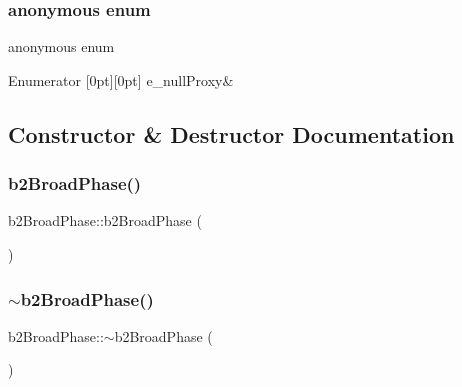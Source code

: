 \subsubsection{\texorpdfstring{anonymous enum}{anonymous enum}}
{\footnotesize\ttfamily anonymous enum}

\begin{DoxyEnumFields}{Enumerator}
[0pt][0pt]{}\mbox{\label{classb2_broad_phase_ad14dca932793724b27024e60a6ade466a8a4f9965a5b0bbb13a35c20a37fef0ad}} 
e\+\_\+null\+Proxy&\\
\hline

\end{DoxyEnumFields}


\subsection{Constructor \& Destructor Documentation}
\mbox{\label{classb2_broad_phase_ac58820d4cb10df81a33923c7c75d8f85}} 
\subsubsection{\texorpdfstring{b2BroadPhase()}{b2BroadPhase()}}
{\footnotesize\ttfamily b2\+Broad\+Phase\+::b2\+Broad\+Phase (\begin{DoxyParamCaption}{ }\end{DoxyParamCaption})}

\mbox{\label{classb2_broad_phase_a40cebf62f00ebfa7ca373ad96f76661f}} 
\subsubsection{\texorpdfstring{$\sim$b2BroadPhase()}{~b2BroadPhase()}}
{\footnotesize\ttfamily b2\+Broad\+Phase\+::$\sim$b2\+Broad\+Phase (\begin{DoxyParamCaption}{ }\end{DoxyParamCaption})}



